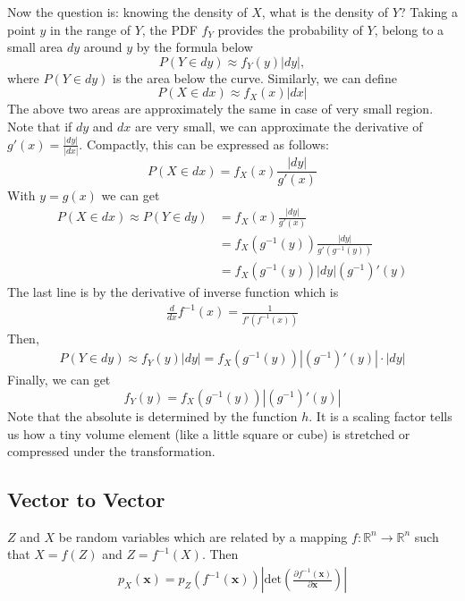 Now the question is: knowing the density of $X$, what is the density of $Y$?
Taking a point $y$ in the range of $Y$, the PDF $f_Y$ provides the probability of $Y$, belong to a small area $dy$ around $y$ by the formula below
$$P(Y\in dy)\approx f_Y(y)|dy|,$$
where $P(Y\in dy)$ is the area below the curve. Similarly, we can define
$$P(X\in dx)\approx f_X(x)|dx|$$
The above two areas are approximately the same in case of very small region. Note that if $dy$ and $dx$ are very small, we can approximate the derivative of $g'(x)=\frac{|dy|}{|dx|}$. Compactly, this can be expressed as follows:
$$P(X\in dx) = f_X(x)\frac{|dy|}{g'(x)}$$
With $y=g(x)$ we can get 
\begin{align*}
	P(X\in dx)\approx P(Y\in dy) &= f_X(x)\frac{|dy|}{g'(x)}\\
	& = f_X(g^{-1}(y))\frac{|dy|}{g'(g^{-1}(y))}\\
	& = f_X(g^{-1}(y))|dy|(g^{-1})'(y)
\end{align*}
The last line is by the derivative of inverse function which is 
\begin{align*}
	\frac{d}{dx}f^{-1}(x) = \frac{1}{f'(f^{-1}(x))}
\end{align*}
Then, 
\begin{align*}
	P(Y\in dy)\approx f_Y(y)|dy| = f_X(g^{-1}(y))|(g^{-1})'(y)|\cdot |dy|
\end{align*}
Finally, we can get 
$$f_Y(y) = f_X(g^{-1}(y))|(g^{-1})'(y)|$$
Note that the absolute is determined by the function $h$. It is a scaling factor tells us how a tiny volume element (like a little square or cube) is stretched or compressed under the transformation. 

\subsection{Vector to Vector}

$Z$ and $X$ be random variables which are related by a mapping $f:\mathbb{R}^n\to \mathbb{R}^n$ such that $X=f(Z)$ and $Z=f^{-1}(X)$. Then
\begin{align*}
	p_X(\mathbf{x}) = p_Z(f^{-1}(\mathbf{x})) \left\vert \text{det}\left(\frac{\partial f^{-1}(\mathbf{x})}{\partial \mathbf{x}}\right) \right\vert
\end{align*}

